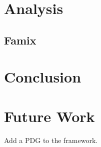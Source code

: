 \section{Analysis}
\subsection{Famix}

\section{Conclusion}
\section{Future Work}
Add a PDG to the framework.
